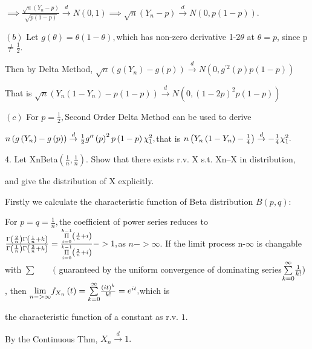 \documentclass{article}
\begin{document}
$\implies \frac{\sqrt{n}\left( Y_{n}-p\right) }{\sqrt{p\left( 1-p\right) }}%
\overset{d}{\rightarrow }N\left( 0,1\right) \implies \sqrt{n}\left(
Y_{n}-p\right) \overset{d}{\rightarrow }N\left( 0,p\left( 1-p\right) \right)
.$

$\left( b\right) $ Let $g\left( \theta \right) =\theta \left( 1-\theta
\right) ,$which has non-zero derivative 1-2$\theta $ at $\theta =p$, since p$%
\neq \frac{1}{2}.$

Then by Delta Method, $\sqrt{n}\left( g\left( Y_{n}\right) -g\left( p\right)
\right) \overset{d}{\rightarrow }N\left( 0,g^{\prime 2}\left( p\right)
p\left( 1-p\right) \right) $

That is $\sqrt{n}\left( Y_{n}\left( 1-Y_{n}\right) -p\left( 1-p\right)
\right) \overset{d}{\rightarrow }N\left( 0,\left( 1-2p\right) ^{2}p\left(
1-p\right) \right) $

$\left( c\right) $ For $p=\frac{1}{2},$Second Order Delta Method can be used
to derive 

$n\left( g\left( Y_{n}\right) -g\left( p\right) \right) \overset{d}{%
\rightarrow }\frac{1}{2}g^{\prime \prime }\left( p\right) ^{2}p\left(
1-p\right) \chi _{1}^{2},$that is $n\left( Y_{n}\left( 1-Y_{n}\right) -\frac{%
1}{4}\right) \overset{d}{\rightarrow }-\frac{1}{4}\chi _{1}^{2}.$

4. Let XnBeta$\left( \frac{1}{n},\frac{1}{n}\right) $. Show that
there exists r.v. X s.t. Xn--\TEXTsymbol{>}X in distribution,

and give the distribution of X explicitly.

Firstly we calculate the characteristic function of Beta distribution $%
B\left( p,q\right) $:


For $p=q=\frac{1}{n},$the coefficient of power series reduces to $\frac{%
\Gamma \left( \frac{2}{n}\right) \Gamma \left( \frac{1}{n}+k\right) }{\Gamma
\left( \frac{1}{n}\right) \Gamma \left( \frac{2}{n}+k\right) }=\frac{\overset%
{k-1}{\underset{i=0}{\Pi }}\left( \frac{1}{n}+i\right) }{\overset{k-1}{%
\underset{i=0}{\Pi }}\left( \frac{2}{n}+i\right) }->1,$as $n->\infty .$ If
the limit process n-\TEXTsymbol{>}$\infty $ is changable with $\sum \qquad ($%
guaranteed by the uniform convergence of dominating series$\underset{k=0}{%
\overset{\infty }{\sum }}\frac{1}{k!})$ , then $\underset{n->\infty }{\lim }%
f_{X_{n}}\left( t\right) =\underset{k=0}{\overset{\infty }{\sum }}\frac{%
\left( it\right) ^{k}}{k!}=e^{it},$which is 

the characteristic function of a constant as r.v. $1.$

By the Continuous Thm, $X_{n}\overset{d}{\rightarrow }1.$
\end{document}
